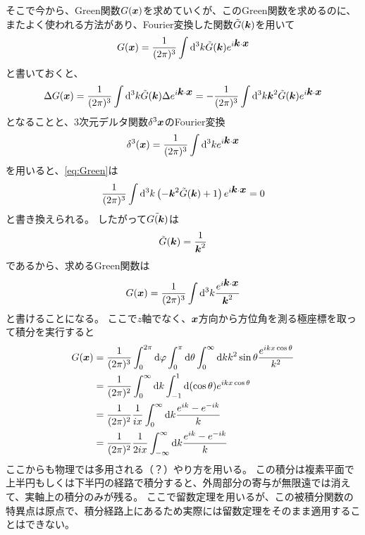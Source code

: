 \documentclass[a4paper]{jsarticle}
\def\vec#1{\mbox{\boldmath $#1$}}
\newcommand{\ddif}{{\rm d}}
\begin{document}
そこで今から、Green関数$G(\vec{x})$を求めていくが、このGreen関数を求めるのに、またよく使われる方法があり、Fourier変換した関数$\tilde{G}(\vec{k})$を用いて
\begin{align}
	G(\vec{x}) = \frac{1}{(2\pi)^3} \int \ddif^3 k \tilde{G}(\vec{k}) e^{i\vec{k} \cdot \vec{x}}
\end{align}
と書いておくと、
\begin{align}
	\Delta G(\vec{x}) = \frac{1}{(2\pi)^3} \int \ddif^3 k \tilde{G}(\vec{k}) \Delta e^{i\vec{k} \cdot \vec{x}}
	= -\frac{1}{(2\pi)^3} \int \ddif^3 k \vec{k}^2 \tilde{G}(\vec{k}) e^{i \vec{k} \cdot \vec{x}}
\end{align}
となることと、3次元デルタ関数$\delta^3{\vec{x}}$のFourier変換
\begin{align}
	\delta^3({\vec{x}}) = \frac{1}{(2\pi)^3} \int \ddif^3 k e^{i\vec{k} \cdot \vec{x}}
\end{align}
を用いると、\eqref{eq:Green}は
\begin{align}
	\frac{1}{(2\pi)^3} \int \ddif^3 k \left( -\vec{k}^2 \tilde{G}(\vec{k}) + 1 \right) e^{i \vec{k} \cdot \vec{x}} = 0
\end{align}
と書き換えられる。
したがって$\tilde{G(\vec{k})}$は
\begin{align}
	\tilde{G}(\vec{k}) = \frac{1}{\vec{k}^2}
\end{align}
であるから、求めるGreen関数は
\begin{align}
	G(\vec{x}) = \frac{1}{(2\pi)^3} \int \ddif^3 k \frac{e^{i\vec{k} \cdot \vec{x}}}{\vec{k}^2}
\end{align}
と書けることになる。
ここで$z$軸でなく、$\vec{x}$方向から方位角を測る極座標を取って積分を実行すると
\begin{align}
	G(\vec{x}) &= \frac{1}{(2\pi)^3} \int_0^{2\pi} \ddif \varphi \int_0^{\pi} \ddif \theta \int_0^{\infty} \ddif k k^2 \sin\theta \frac{e^{ikx \cos\theta}}{k^2} \\
	&= \frac{1}{(2\pi)^2} \int_0^{\infty} \ddif k \int_{-1}^1 \ddif (\cos\theta) e^{ikx \cos\theta} \\
	&= \frac{1}{(2\pi)^2} \frac{1}{ix} \int_0^{\infty} \ddif k \frac{e^{ik} - e^{-ik}}{k} \\
	&= \frac{1}{(2\pi)^2} \frac{1}{2ix} \int_{-\infty}^{\infty} \ddif k \frac{e^{ik} - e^{-ik}}{k}
\end{align}
ここからも物理では多用される（？）やり方を用いる。
この積分は複素平面で上半円もしくは下半円の経路で積分すると、外周部分の寄与が無限遠では消えて、実軸上の積分のみが残る。
ここで留数定理を用いるが、この被積分関数の特異点は原点で、積分経路上にあるため実際には留数定理をそのまま適用することはできない。
\end{document}
